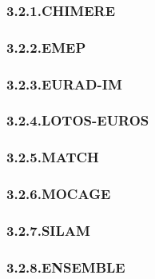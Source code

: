 \documentclass[9pt]{report}
\begin{document}
\subsubsection{3.2.1.\hspace*{0.5em}CHIMERE}\label{sec-chimere}%

\subsubsection{3.2.2.\hspace*{0.5em}EMEP}\label{sec-emep}%

\subsubsection{3.2.3.\hspace*{0.5em}EURAD-IM}\label{sec-eurad-im}%

\subsubsection{3.2.4.\hspace*{0.5em}LOTOS-EUROS}\label{sec-lotos-euros}%

\subsubsection{3.2.5.\hspace*{0.5em}MATCH}\label{sec-match}%

\subsubsection{3.2.6.\hspace*{0.5em}MOCAGE}\label{sec-mocage}%

\subsubsection{3.2.7.\hspace*{0.5em}SILAM}\label{sec-silam}%

\subsubsection{3.2.8.\hspace*{0.5em}ENSEMBLE}\label{sec-ensemble}%
\end{document}
